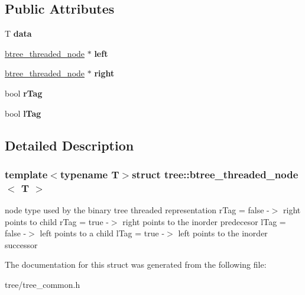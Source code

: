 \subsection*{Public Attributes}
\begin{DoxyCompactItemize}
\item 
\hypertarget{structtree_1_1btree__threaded__node_a4eedf9c4f0d905ca2163d37ddcb855be}{T {\bfseries data}}\label{structtree_1_1btree__threaded__node_a4eedf9c4f0d905ca2163d37ddcb855be}

\item 
\hypertarget{structtree_1_1btree__threaded__node_ae2f6a8e3479fc61c5cd635a649a2b0f0}{\hyperlink{structtree_1_1btree__threaded__node}{btree\-\_\-threaded\-\_\-node} $\ast$ {\bfseries left}}\label{structtree_1_1btree__threaded__node_ae2f6a8e3479fc61c5cd635a649a2b0f0}

\item 
\hypertarget{structtree_1_1btree__threaded__node_ad2ffcfc42ad38e941223e32995013b21}{\hyperlink{structtree_1_1btree__threaded__node}{btree\-\_\-threaded\-\_\-node} $\ast$ {\bfseries right}}\label{structtree_1_1btree__threaded__node_ad2ffcfc42ad38e941223e32995013b21}

\item 
\hypertarget{structtree_1_1btree__threaded__node_a06b2ebcf5e85dd9feb184872af4a6e30}{bool {\bfseries r\-Tag}}\label{structtree_1_1btree__threaded__node_a06b2ebcf5e85dd9feb184872af4a6e30}

\item 
\hypertarget{structtree_1_1btree__threaded__node_a1179a89253389e3c964653739394fbbd}{bool {\bfseries l\-Tag}}\label{structtree_1_1btree__threaded__node_a1179a89253389e3c964653739394fbbd}

\end{DoxyCompactItemize}


\subsection{Detailed Description}
\subsubsection*{template$<$typename T$>$struct tree\-::btree\-\_\-threaded\-\_\-node$<$ T $>$}

node type used by the binary tree threaded representation r\-Tag = false -\/$>$ right points to child r\-Tag = true -\/$>$ right points to the inorder predecesor l\-Tag = false -\/$>$ left points to a child l\-Tag = true -\/$>$ left points to the inorder successor 

The documentation for this struct was generated from the following file\-:\begin{DoxyCompactItemize}
\item 
tree/tree\-\_\-common.\-h\end{DoxyCompactItemize}
